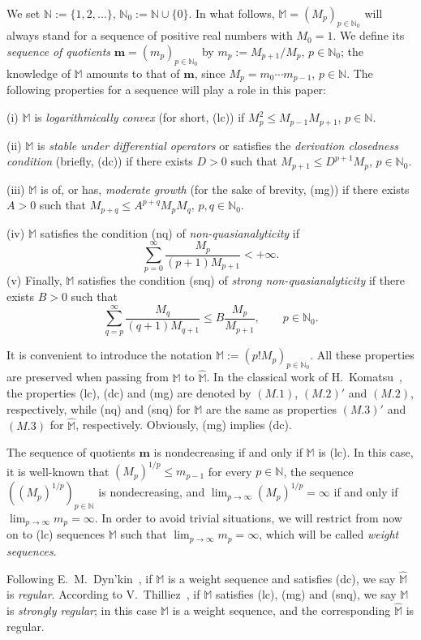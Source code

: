 \documentclass[11pt,a4paper]{article}
\theoremstyle{plain}
\theoremstyle{definition}
\newcommand{\N}{\mathbb{N}}
\newcommand{\bM}{\mathbb{M}}
\newcommand{\M}{\mathbb{M}}
\newcommand{\hM}{\widehat{\M}}
\newcommand{\m}{\boldsymbol{m}}
\begin{document}
We set $\N:=\{1,2,...\}$, $\N_{0}:=\N\cup\{0\}$.
In what follows, $\bM=(M_p)_{p\in\N_0}$ will always stand for a sequence of positive real numbers with $M_0=1$. We define its {\it sequence of quotients}  $\m=(m_p)_{p\in\N_0}$ by
$m_p:=M_{p+1}/M_p$, $p\in \N_0$; the knowledge of $\M$ amounts to that of $\m$, since $M_p=m_0\cdots m_{p-1}$, $p\in\N$.
The following properties for a sequence will play a role in this paper:\par
(i) $\M$ is \emph{logarithmically convex} (for short, (lc)) if
$M_{p}^{2}\le M_{p-1}M_{p+1}$, $p\in\N$.\par
(ii) $\M$ is \emph{stable under differential operators} or satisfies the \emph{derivation closedness condition} (briefly, (dc)) if there exists $D>0$ such that $M_{p+1}\leq D^{p+1} M_{p}$, $p\in\N_{0}$.\par
(iii) $\M$ is of, or has, \emph{moderate growth} (for the sake of brevity, (mg)) if there exists $A>0$ such that
$M_{p+q}\le A^{p+q}M_{p}M_{q}$, $p,q\in\N_0$.\par
(iv) $\M$ satisfies the condition (nq) of \emph{non-quasianalyticity} if
$$\sum_{p=0}^{\infty}\frac{M_{p}}{(p+1)M_{p+1}}<+\infty.
$$
\indent (v) Finally, $\M$ satisfies the condition (snq) of \emph{strong non-quasianalyticity} if there exists $B>0$ such that
$$
\sum^\infty_{q= p}\frac{M_{q}}{(q+1)M_{q+1}}\le B\frac{M_{p}}{M_{p+1}},\qquad p\in\N_0.$$

It is convenient to introduce the notation $\hM:=(p!M_p)_{p\in\N_0}$.
All these properties are preserved when passing from $\M$ to $\hM$.
In the classical work of H.~Komatsu~\cite{komatsu}, the properties (lc), (dc) and (mg) are denoted by $(M.1)$, $(M.2)'$ and $(M.2)$, respectively, while
(nq) and (snq) for $\M$ are the same as properties $(M.3)'$ and $(M.3)$ for $\widehat{\M}$, respectively.
Obviously, (mg) implies (dc).

The sequence of quotients $\m$ is nondecreasing if and only if $\M$ is (lc). In this case, it is well-known that $(M_p)^{1/p}\leq m_{p-1}$ for every $p\in\N$, the sequence $((M_p)^{1/p})_{p\in\N}$ is nondecreasing, and $\lim_{p\to\infty} (M_p)^{1/p}= \infty$ if and only if $\lim_{p\to\infty} m_p= \infty$. In order to avoid trivial situations, we will restrict from now on to
(lc) sequences $\M$ such that $\lim_{p\to\infty} m_p =\infty$, which will be called \emph{weight sequences}.

Following E.~M.~Dyn'kin~\cite{Dynkin80}, if $\M$ is a weight sequence and satisfies (dc), we say $\hM$ is \emph{regular}. According to V.~Thilliez~\cite{Thilliez03}, if $\M$ satisfies (lc), (mg) and (snq), we say $\M$ is \emph{strongly regular}; in this case $\M$ is a weight sequence, and the corresponding $\hM$ is regular.
\end{document}
